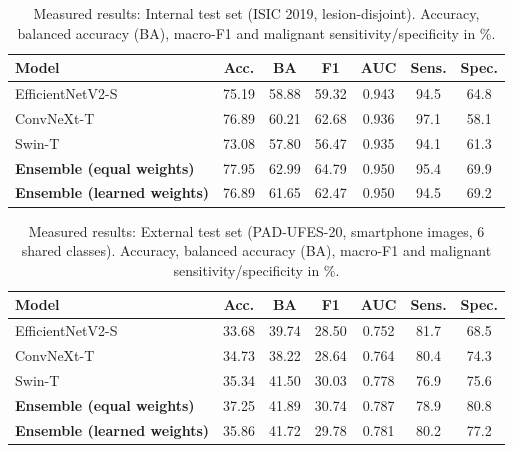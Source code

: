 \begin{table}[t]
\centering
\caption{Measured results: Internal test set (ISIC 2019, lesion-disjoint). Accuracy, balanced accuracy (BA), macro-F1 and malignant sensitivity/specificity in \%.}
\label{tab:res_internal}
\renewcommand{\arraystretch}{1.15}
\footnotesize
\begin{tabular}{@{}l c c c c c c@{}}
\toprule
\textbf{Model} & \textbf{Acc.} & \textbf{BA} & \textbf{F1} & \textbf{AUC} & \textbf{Sens.} & \textbf{Spec.} \\
\midrule
EfficientNetV2-S & 75.19 & 58.88 & 59.32 & 0.943 & 94.5 & 64.8 \\
ConvNeXt-T & 76.89 & 60.21 & 62.68 & 0.936 & 97.1 & 58.1 \\
Swin-T & 73.08 & 57.80 & 56.47 & 0.935 & 94.1 & 61.3 \\
\textbf{Ensemble (equal weights)} & 77.95 & 62.99 & 64.79 & 0.950 & 95.4 & 69.9 \\
\textbf{Ensemble (learned weights)} & 76.89 & 61.65 & 62.47 & 0.950 & 94.5 & 69.2 \\
\bottomrule
\end{tabular}
\end{table}

\begin{table}[t]
\centering
\caption{Measured results: External test set (PAD-UFES-20, smartphone images, 6 shared classes). Accuracy, balanced accuracy (BA), macro-F1 and malignant sensitivity/specificity in \%.}
\label{tab:res_external}
\renewcommand{\arraystretch}{1.15}
\footnotesize
\begin{tabular}{@{}l c c c c c c@{}}
\toprule
\textbf{Model} & \textbf{Acc.} & \textbf{BA} & \textbf{F1} & \textbf{AUC} & \textbf{Sens.} & \textbf{Spec.} \\
\midrule
EfficientNetV2-S & 33.68 & 39.74 & 28.50 & 0.752 & 81.7 & 68.5 \\
ConvNeXt-T & 34.73 & 38.22 & 28.64 & 0.764 & 80.4 & 74.3 \\
Swin-T & 35.34 & 41.50 & 30.03 & 0.778 & 76.9 & 75.6 \\
\textbf{Ensemble (equal weights)} & 37.25 & 41.89 & 30.74 & 0.787 & 78.9 & 80.8 \\
\textbf{Ensemble (learned weights)} & 35.86 & 41.72 & 29.78 & 0.781 & 80.2 & 77.2 \\
\bottomrule
\end{tabular}
\end{table}
